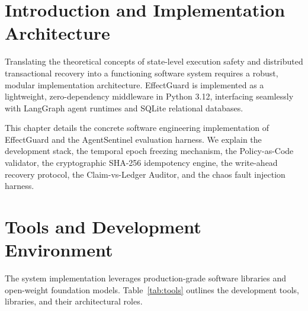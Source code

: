 
\section{Introduction and Implementation Architecture}

Translating the theoretical concepts of state-level execution safety and distributed transactional recovery into a functioning software system requires a robust, modular implementation architecture. EffectGuard is implemented as a lightweight, zero-dependency middleware in Python 3.12, interfacing seamlessly with LangGraph agent runtimes and SQLite relational databases.

This chapter details the concrete software engineering implementation of EffectGuard and the AgentSentinel evaluation harness. We explain the development stack, the temporal epoch freezing mechanism, the Policy-as-Code validator, the cryptographic SHA-256 idempotency engine, the write-ahead recovery protocol, the Claim-vs-Ledger Auditor, and the chaos fault injection harness.

\section{Tools and Development Environment}

The system implementation leverages production-grade software libraries and open-weight foundation models. Table~\ref{tab:tools} outlines the development tools, libraries, and their architectural roles.


